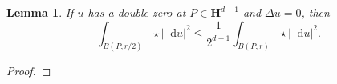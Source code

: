 \documentclass[reqno,12pt,letterpaper]{amsart}
\newcommand{\RR}{\mathbf{R}}
\newcommand{\Hyp}{\mathbf H}
\newcommand*\dif{\mathop{}\!\mathrm{d}}
\newcommand{\dfn}[1]{\emph{#1}\index{#1}}
\newtheorem{lemma}[theorem]{Lemma}
\theoremstyle{definition}
\newtheorem{definition}[theorem]{Definition}
\numberwithin{equation}{section}
\begin{document}
\begin{lemma}
If $u$ has a double zero at $P \in \Hyp^{d - 1}$ and $\Delta u = 0$, then 
$$\int_{B(P, r/2)} \star |\dif u|^2 \leq \frac{1}{2^{d + 1}} \int_{B(P, r)} \star |\dif u|^2.$$
\end{lemma}
\begin{proof}

\end{proof}





\end{document}
